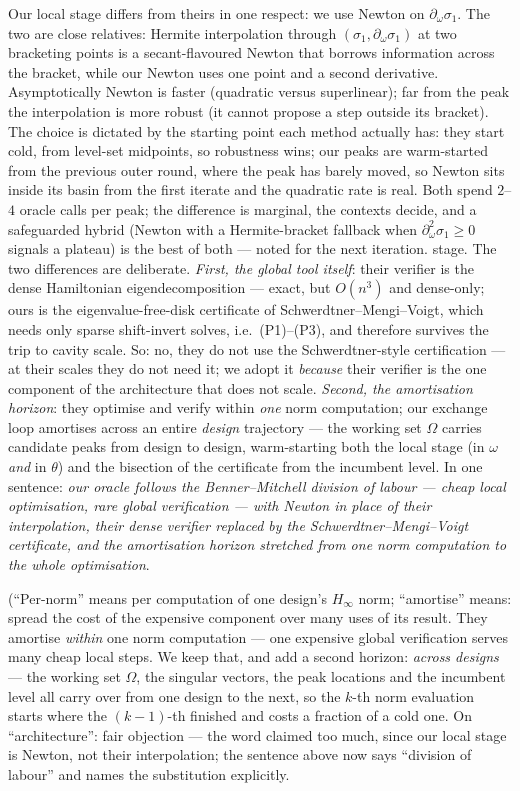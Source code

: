 \documentclass[11pt,a4paper]{article}
\begin{document}
{Our local stage differs from theirs in one respect: we use Newton on
$\partial_\omega\sigma_1$.  The two are close relatives: Hermite interpolation through
$(\sigma_1,\partial_\omega\sigma_1)$ at two bracketing points is a secant-flavoured
Newton that borrows information across the bracket, while our Newton uses one point and a
second derivative.  Asymptotically Newton is faster (quadratic versus superlinear); far
from the peak the interpolation is more robust (it cannot propose a step outside its
bracket).  The choice is dictated by the starting point each method actually has: they
start cold, from level-set midpoints, so robustness wins; our peaks are warm-started from
the previous outer round, where the peak has barely moved, so Newton sits inside its
basin from the first iterate and the quadratic rate is real.  Both spend $2$--$4$ oracle
calls per peak; the difference is marginal, the contexts decide, and a safeguarded hybrid
(Newton with a Hermite-bracket fallback when $\partial^2_\omega\sigma_1\ge0$ signals a
plateau) is the best of both --- noted for the next iteration.
stage.  The two differences are deliberate.  \emph{First, the global tool itself}: their
verifier is the dense Hamiltonian eigendecomposition --- exact, but $O(n^3)$ and
dense-only; ours is the eigenvalue-free-disk certificate of Schwerdtner--Mengi--Voigt,
which needs only sparse shift-invert solves, i.e.\ (P1)--(P3), and therefore survives
the trip to cavity scale.  So: no, they do not use the Schwerdtner-style certification
--- at their scales they do not need it; we adopt it \emph{because} their verifier is
the one component of the architecture that does not scale.  \emph{Second, the
amortisation horizon}: they optimise and verify within \emph{one} norm computation; our
exchange loop amortises across an entire \emph{design} trajectory --- the working set
$\Omega$ carries candidate peaks from design to design, warm-starting both the local
stage (in $\omega$ \emph{and} in $\theta$) and the bisection of the certificate from the
incumbent level.  In one sentence: \emph{our oracle follows the Benner--Mitchell division of labour ---
cheap local optimisation, rare global verification --- with Newton in place of their
interpolation, their dense verifier replaced by the Schwerdtner--Mengi--Voigt
certificate, and the amortisation horizon stretched from one norm computation to the
whole optimisation}.

(``Per-norm'' means per computation of one design's $H_\infty$ norm; ``amortise'' means: spread the cost of the expensive component over many uses of its result.  They
amortise \emph{within} one norm computation --- one expensive global verification serves
many cheap local steps.  We keep that, and add a second horizon: \emph{across designs} ---
the working set $\Omega$, the singular vectors, the peak locations and the incumbent
level all carry over from one design to the next, so the $k$-th norm evaluation starts
where the $(k-1)$-th finished and costs a fraction of a cold one.  On ``architecture'':
fair objection --- the word claimed too much, since our local stage is Newton, not their
interpolation; the sentence above now says ``division of labour'' and names the
substitution explicitly.

}
\end{document}
